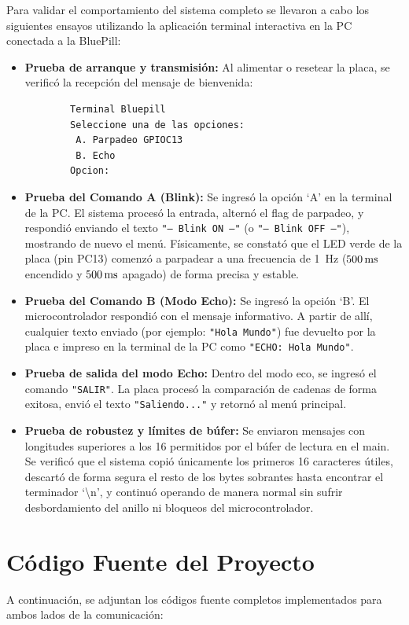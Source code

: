Para validar el comportamiento del sistema completo se llevaron a cabo los siguientes ensayos utilizando la
aplicación terminal interactiva en la PC conectada a la BluePill:
\begin{itemize}
  \item \textbf{Prueba de arranque y transmisión:} Al alimentar o resetear la placa, se verificó la recepción del
        mensaje de bienvenida:
        \begin{verbatim}
        Terminal Bluepill
        Seleccione una de las opciones:
         A. Parpadeo GPIOC13
         B. Echo
        Opcion:
        \end{verbatim}
  \item \textbf{Prueba del Comando A (Blink):} Se ingresó la opción `A' en la terminal de la PC. El sistema procesó la
        entrada, alternó el flag de parpadeo, y respondió enviando el texto \texttt{"-- Blink ON --"} (o \texttt{"-- Blink OFF --"}),
        mostrando de nuevo el menú. Físicamente, se constató que el LED verde de la placa (pin PC13) comenzó a parpadear a una frecuencia de
        \qty{1}{\Hz} ($500\,\mathrm{ms}$ encendido y $500\,\mathrm{ms}$ apagado) de forma precisa y estable.
  \item \textbf{Prueba del Comando B (Modo Echo):} Se ingresó la opción `B'. El microcontrolador respondió con
        el mensaje informativo. A partir de allí, cualquier texto enviado (por ejemplo: \texttt{"Hola Mundo"}) fue devuelto
        por la placa e impreso en la terminal de la PC como \texttt{"ECHO: Hola Mundo"}.
  \item \textbf{Prueba de salida del modo Echo:} Dentro del modo eco, se ingresó el comando \texttt{"SALIR"}. La placa
        procesó la comparación de cadenas de forma exitosa, envió el texto \texttt{"Saliendo..."} y retornó al menú principal.
  \item \textbf{Prueba de robustez y límites de búfer:} Se enviaron mensajes con longitudes superiores a los
        \qty{16}{\byte} permitidos por el búfer de lectura en el main. Se verificó que el sistema copió únicamente los primeros
        16 caracteres útiles, descartó de forma segura el resto de los bytes sobrantes hasta encontrar el terminador `\textbackslash n',
        y continuó operando de manera normal sin sufrir desbordamiento del anillo ni bloqueos del microcontrolador.
\end{itemize}

\section{Código Fuente del Proyecto}

A continuación, se adjuntan los códigos fuente completos implementados para ambos lados de la comunicación:





